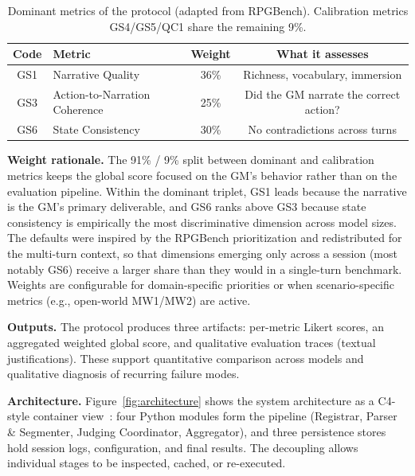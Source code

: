 \documentclass[12pt]{article}
\begin{document}
\begin{table}[ht]
\centering
\caption{Dominant metrics of the protocol (adapted from RPGBench). Calibration metrics GS4/GS5/QC1 share the remaining 9\%.}
\label{tab:metrics}
\small
\begin{tabular}{clcc}
\toprule
\textbf{Code} & \textbf{Metric} & \textbf{Weight} & \textbf{What it assesses} \\
\midrule
GS1 & Narrative Quality            & 36\% & Richness, vocabulary, immersion \\
GS3 & Action-to-Narration Coherence & 25\% & Did the GM narrate the correct action? \\
GS6 & State Consistency             & 30\% & No contradictions across turns \\
\bottomrule
\end{tabular}
\end{table}

\textbf{Weight rationale.} The 91\% / 9\% split between dominant and calibration metrics keeps the global score focused on the GM's behavior rather than on the evaluation pipeline. Within the dominant triplet, GS1 leads because the narrative is the GM's primary deliverable, and GS6 ranks above GS3 because state consistency is empirically the most discriminative dimension across model sizes. The defaults were inspired by the RPGBench prioritization \cite{yu:2025} and redistributed for the multi-turn context, so that dimensions emerging only across a session (most notably GS6) receive a larger share than they would in a single-turn benchmark. Weights are configurable for domain-specific priorities or when scenario-specific metrics (e.g., open-world MW1/MW2) are active.

\textbf{Outputs.} The protocol produces three artifacts: per-metric Likert scores, an aggregated weighted global score, and qualitative evaluation traces (textual justifications). These support quantitative comparison across models and qualitative diagnosis of recurring failure modes.

\textbf{Architecture.} Figure~\ref{fig:architecture} shows the system architecture as a C4-style container view~\cite{brown:2024}: four Python modules form the pipeline (Registrar, Parser \& Segmenter, Judging Coordinator, Aggregator), and three persistence stores hold session logs, configuration, and final results. The decoupling allows individual stages to be inspected, cached, or re-executed.
\end{document}
